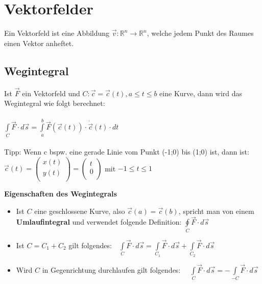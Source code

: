 \section{Vektorfelder}
Ein Vektorfeld ist eine Abbildung $\vec{v}:\mathbb{R}^n\rightarrow
\mathbb{R}^n$, welche jedem Punkt des Raumes einen Vektor anheftet.
\subsection{Wegintegral}
Ist $\vec{F}$ ein Vektorfeld und $C:\vec{c}=\vec{c}(t),a\leq t \leq b$ eine
Kurve, dann wird das Wegintegral wie folgt berechnet:\\\\
$\boxed{\int\limits_C\vec{F}\cdot d\vec{s}=
\int\limits_a^b\vec{F}(\vec{c}(t))\cdot \dot{\vec{c}}(t)\cdot dt}$\\\\
Tipp: Wenn c bspw. eine gerade Linie vom Punkt (-1;0) bis (1;0) ist, dann ist:\\
$\vec{c}(t)=
  \begin{pmatrix}
      x(t)\\
      y(t)\\
  \end{pmatrix}
  =
    \begin{pmatrix}
      t\\
      0\\
  \end{pmatrix}$
  mit $-1\leq t \leq 1$

\textbf{Eigenschaften des Wegintegrals}
\begin{itemize}
  \item Ist $C$ eine geschlossene Kurve, also $\vec{c}(a)=\vec{c}(b)$, spricht
  man von einem \textbf{Umlaufintegral} und verwendet folgende Definition:
  $\oint\limits_C \vec{F}\cdot d\vec{s}$
  \item Ist $C=C_1+C_2$ gilt folgendes:$\quad\int\limits_C \vec{F}\cdot
  d\vec{s}=\int\limits_{C_1} \vec{F}\cdot d\vec{s}+\int\limits_{C_2}
  \vec{F}\cdot d\vec{s}$
  \item Wird $C$ in Gegenrichtung durchlaufen gilt folgendes:
  $\quad\int\limits_C \vec{F}\cdot
  d\vec{s}=-\int\limits_{-C} \vec{F}\cdot d\vec{s}$
\end{itemize}

